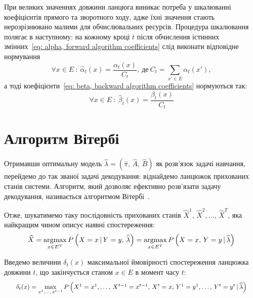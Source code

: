\newpage
\begin{remark}
    При великих значеннях довжини ланцюга виникає потреба у шкалюванні~\cite[розділ 5]{Nilsson2005} коефіцієнтів прямого та зворотного ходу, адже їхні значення стають нерозрізнювано малими для обчислювальних ресурсів. Процедура шкалювання полягає в наступному: на кожному кроці $t$ після обчислення істинних змінних~\eqref{eq: alpha, forward algorithm coefficients} слід виконати відповідне нормування
    \begin{equation*}
        \forall x \in E\ :\ \widehat{\alpha}_t(x) = \frac{\alpha_t(x)}{C_t},\ \text{де}\ C_t = \sum\limits_{x' \in E}\alpha_t(x'),
    \end{equation*}
    а тоді коефіцієнти~\eqref{eq: beta, backward algorithm coefficients} нормуються так:
    \begin{equation*}
        \forall x \in E\ :\ \widehat{\beta}_t(x) = \frac{\beta_t(x)}{C_t}
    \end{equation*}
\end{remark}

\section{Алгоритм Вітербі}
\label{section: Viterbi alorithm}

Отримавши оптимальну модель $\widehat{\lambda}=(\widehat{\pi},\,\widehat{A},\,\widehat{B})$ як розв'язок задачі навчання, перейдемо до так званої задачі декодування: віднайдемо ланцюжок прихованих станів системи. Алгоритм, який дозволяє ефективно розв’язати задачу декодування, називається алгоритмом Вітербі~\cite[розділ 6]{Nilsson2005}.

Отже, шукатимемо таку послідовність прихованих станів $\widehat{X}^1,\,\widehat{X}^2,\ldots,\,\widehat{X}^T$, яка найкращим чином описує наявні спостереження:
\begin{equation*}
    \widehat{X} = \operatorname*{argmax}\limits_{x \in E^T} P\left( X=x \,|\, Y=y,\, \widehat{\lambda} \right) = \operatorname*{argmax}\limits_{x \in E^T} P\left( X=x,\, Y=y \,|\, \widehat{\lambda} \right)
\end{equation*}

Введемо величини $\delta_t(x)$ максимальної ймовірності спостереження ланцюжка довжини $t$, що закінчується станом $x \in E$ в момент часу $t:$
\begin{equation*}\scaleq[0.9]{
    \delta_t(x)=\max\limits_{x^1,\ldots,\,x^{t-1}}P\left( X^1=x^1,\ldots,\,X^{t-1}=x^{t-1},\,X^t=x,\,Y^1=y^1,\ldots,\,Y^t=y^t \,|\, \widehat{\lambda}  \right)}
\end{equation*}

